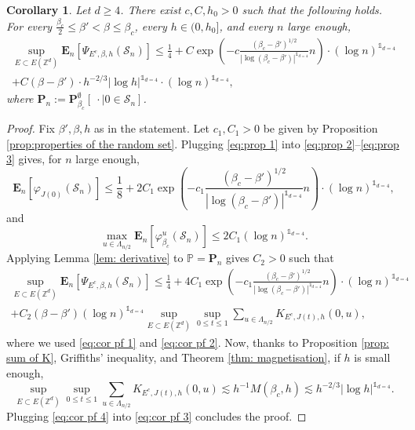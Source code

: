\documentclass[10pt,a4paper]{amsart}
\numberwithin{equation}{section}
\newtheorem{Coro}[Thm]{Corollary}
\begin{document}
\begin{Coro}\label{coro:bound on psi} Let $d\geq 4$. There exist $c,C,h_0>0$ such that the following holds. For every $\tfrac{\beta_c}{2}\leq \beta'< \beta\leq \beta_c$, every $h\in (0,h_0]$, and every $n$ large enough,
\begin{multline}
	\sup_{E\subset E(\mathbb Z^d)}\mathbf E_n[\Psi_{E^c,\beta,h}(\mathcal S_n)]\leq \frac{1}{4}+ C\exp\left(-c\frac{(\beta_c-\beta')^{1/2}}{|\log (\beta_c-\beta')|^{\mathds{1}_{d=4}}}n\right)\cdot (\log n)^{\mathds{1}_{d=4}}
	\\+C(\beta-\beta')\cdot h^{-2/3}|\log h|^{\mathds{1}_{d=4}}\cdot (\log n)^{\mathds{1}_{d=4}},
\end{multline}
where $\mathbf P_n:=\mathbf P^\emptyset_{\beta_c}[\:\cdot \mid 0\in \mathcal S_n]$.
\end{Coro}
\begin{proof} Fix $\beta',\beta,h$ as in the statement. Let $c_1,C_1>0$ be given by Proposition \ref{prop:properties of the random set}. Plugging \eqref{eq:prop 1} into \eqref{eq:prop 2}--\eqref{eq:prop 3} gives, for $n$ large enough,
\begin{equation}\label{eq:cor pf 1}
	\mathbf E_n[\varphi_{J(0)}(\mathcal S_n)]\leq \frac{1}{8}+2C_1\exp\left(-c_1\frac{(\beta_c-\beta')^{1/2}}{|\log (\beta_c-\beta')|^{\mathds{1}_{d=4}}} n\right)\cdot (\log n)^{\mathds{1}_{d=4}},
\end{equation}
and
\begin{equation}\label{eq:cor pf 2}
		\max_{u\in \Lambda_{n/2}}\mathbf E_n[\varphi_{\beta_c}^u(\mathcal S_n)]\leq 2C_1(\log n)^{\mathds{1}_{d=4}}.
\end{equation}
Applying Lemma \ref{lem: derivative} to $\mathbb P=\mathbf P_n$ gives $C_2>0$ such that
\begin{multline}\label{eq:cor pf 3}
	\sup_{E\subset E(\mathbb Z^d)}\mathbf E_n[\Psi_{E^c,\beta,h}(\mathcal S_n)]\leq \frac{1}{4}+4C_1\exp\left(-c_1\frac{(\beta_c-\beta')^{1/2}}{|\log (\beta_c-\beta')|^{\mathds{1}_{d=4}}} n\right)\cdot (\log n)^{\mathds{1}_{d=4}}
	\\+C_2(\beta-\beta') (\log n)^{\mathds{1}_{d=4}} \sup_{E\subset E(\mathbb Z^d)}\sup_{0\leq t\leq 1}\sum_{u\in \Lambda_{n/2}}K_{E^c,J(t),h}(0,u),
\end{multline}
where we used \eqref{eq:cor pf 1} and \eqref{eq:cor pf 2}. Now, thanks to Proposition \ref{prop: sum of K}, Griffiths' inequality, and Theorem \ref{thm: magnetisation}, if $h$ is small enough,
\begin{equation}\label{eq:cor pf 4}
	\sup_{E\subset E(\mathbb Z^d)}\sup_{0\leq t\leq 1}\sum_{u\in \Lambda_{n/2}}K_{E^c,J(t),h}(0,u)\lesssim h^{-1} M(\beta_c,h)\lesssim h^{-2/3}|\log h|^{\mathds{1}_{d=4}}.
\end{equation} 
		Plugging \eqref{eq:cor pf 4} into \eqref{eq:cor pf 3} concludes the proof.
\end{proof}
\end{document}
